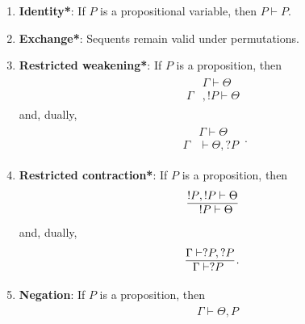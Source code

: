     \begin{enumerate}
        \item\textbf{Identity*}: If $P$ is a propositional variable, then $P\vdash P$.
        \item\textbf{Exchange*}: Sequents remain valid under permutations.
        \item\textbf{Restricted weakening*}: If $P$ is a proposition, then
            \begin{gather}
                \begin{aligned}
                    &\Gamma\vdash\Theta\\
                    \hline
                    \Gamma&,!P\vdash\Theta
                \end{aligned}
            \end{gather}
            and, dually,
            \begin{gather}
                \begin{aligned}
                    &\Gamma\vdash\Theta\\
                    \hline
                    \Gamma&\vdash\Theta,?P
                \end{aligned}\,.
            \end{gather}
        \item\textbf{Restricted contraction*}: If $P$ is a proposition, then
            \begin{gather}
                \begin{aligned}
                    !P&,!P\vdash\Theta\\
                    \hline
                    &!P\vdash\Theta
                \end{aligned}
            \end{gather}
            and, dually,
            \begin{gather}
                \begin{aligned}
                    \Gamma&\vdash?P,?P\\
                    \hline
                    &\Gamma\vdash?P
                \end{aligned}\,.
            \end{gather}
        \item\textbf{Negation}: If $P$ is a proposition, then
            \begin{gather}
                \begin{aligned}
                    &\Gamma\vdash\Theta,P\\

\end{aligned}
\end{gather}
\end{enumerate}
